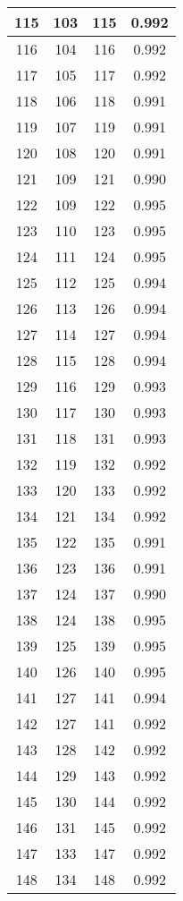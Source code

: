 \begin{table}
\begin{tabular}{|c|c|c|c|}
 115  & 103  & 115 & 0.992  \\ \hline
 116  & 104  & 116 & 0.992  \\ \hline
 117  & 105  & 117 & 0.992  \\ \hline
 118  & 106  & 118 & 0.991  \\ \hline
 119  & 107  & 119 & 0.991  \\ \hline
 120  & 108  & 120 & 0.991  \\ \hline
 121  & 109  & 121 & 0.990  \\ \hline
 122  & 109  & 122 & 0.995  \\ \hline
 123  & 110  & 123 & 0.995  \\ \hline
 124  & 111  & 124 & 0.995  \\ \hline
 125  & 112  & 125 & 0.994  \\ \hline
 126  & 113  & 126 & 0.994  \\ \hline
 127  & 114  & 127 & 0.994  \\ \hline
 128  & 115  & 128 & 0.994  \\ \hline
 129  & 116  & 129 & 0.993  \\ \hline
 130  & 117  & 130 & 0.993  \\ \hline
 131  & 118  & 131 & 0.993  \\ \hline
 132  & 119  & 132 & 0.992  \\ \hline
 133  & 120  & 133 & 0.992  \\ \hline
 134  & 121  & 134 & 0.992  \\ \hline
 135  & 122  & 135 & 0.991  \\ \hline
 136  & 123  & 136 & 0.991  \\ \hline
 137  & 124  & 137 & 0.990  \\ \hline
 138  & 124  & 138 & 0.995  \\ \hline
 139  & 125  & 139 & 0.995  \\ \hline
 140  & 126  & 140 & 0.995  \\ \hline
 141  & 127  & 141 & 0.994  \\ \hline
 142  & 127  & 141 & 0.992  \\ \hline
 143  & 128  & 142 & 0.992  \\ \hline
 144  & 129  & 143 & 0.992  \\ \hline
 145  & 130  & 144 & 0.992  \\ \hline
 146  & 131  & 145 & 0.992  \\ \hline
 147  & 133  & 147 & 0.992  \\ \hline
 148  & 134  & 148 & 0.992  \\ \hline

\end{tabular}
\end{table}
